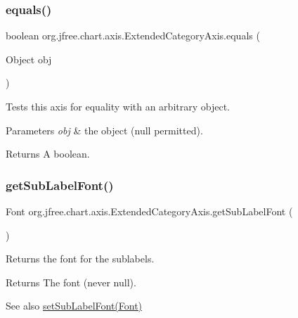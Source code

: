 \subsubsection{\texorpdfstring{equals()}{equals()}}
{\footnotesize\ttfamily boolean org.\+jfree.\+chart.\+axis.\+Extended\+Category\+Axis.\+equals (\begin{DoxyParamCaption}\item[{Object}]{obj }\end{DoxyParamCaption})}

Tests this axis for equality with an arbitrary object.


\begin{DoxyParams}{Parameters}
{\em obj} & the object ({\ttfamily null} permitted).\\
\hline
\end{DoxyParams}
\begin{DoxyReturn}{Returns}
A boolean. 
\end{DoxyReturn}
\mbox{\label{classorg_1_1jfree_1_1chart_1_1axis_1_1_extended_category_axis_a0b167c7b8149bdaa6f608d0bd2fea7b9}} 
\subsubsection{\texorpdfstring{get\+Sub\+Label\+Font()}{getSubLabelFont()}}
{\footnotesize\ttfamily Font org.\+jfree.\+chart.\+axis.\+Extended\+Category\+Axis.\+get\+Sub\+Label\+Font (\begin{DoxyParamCaption}{ }\end{DoxyParamCaption})}

Returns the font for the sublabels.

\begin{DoxyReturn}{Returns}
The font (never {\ttfamily null}).
\end{DoxyReturn}
\begin{DoxySeeAlso}{See also}
\mbox{\hyperlink{classorg_1_1jfree_1_1chart_1_1axis_1_1_extended_category_axis_aaaa091e9b6e36820bbae9783a54746f5}{set\+Sub\+Label\+Font(\+Font)}} 
\end{DoxySeeAlso}
\mbox{\label{classorg_1_1jfree_1_1chart_1_1axis_1_1_extended_category_axis_a1aece6e248db92354b6a61e3af1c1e57}} 
